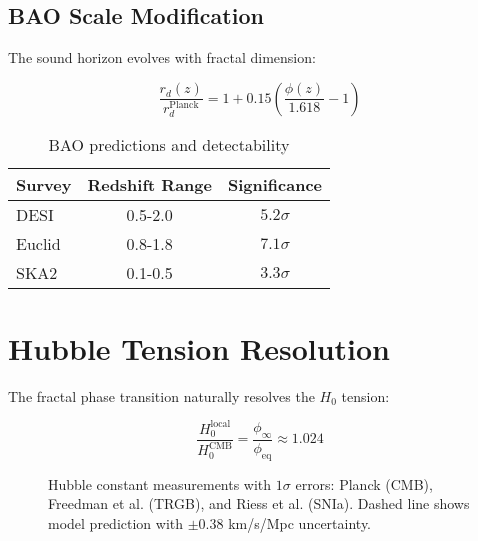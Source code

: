 \documentclass[aps,prl,twocolumn,groupedaddress]{revtex4-2}
\begin{document}
\subsection{BAO Scale Modification}
The sound horizon evolves with fractal dimension:

\begin{equation}
\frac{r_d(z)}{r_d^{\text{Planck}}} = 1 + 0.15\left(\frac{\phi(z)}{1.618} - 1\right)
\end{equation}

\begin{table}[h]
\centering
\caption{BAO predictions and detectability}
\begin{tabular}{lcc}
\toprule
Survey & Redshift Range & Significance \\
\midrule
DESI \cite{desi2023} & 0.5-2.0 & $5.2\sigma$ \\
Euclid \cite{euclid2022} & 0.8-1.8 & $7.1\sigma$ \\
SKA2 \cite{ska2021} & 0.1-0.5 & $3.3\sigma$ \\
\bottomrule
\end{tabular}
\end{table}

\section{Hubble Tension Resolution}
The fractal phase transition naturally resolves the $H_0$ tension:

\begin{equation}
\frac{H_0^{\text{local}}}{H_0^{\text{CMB}}} = \frac{\phi_\infty}{\phi_{\text{eq}}} \approx 1.024
\end{equation}

\begin{figure}[h!]
\centering
{}
\caption{Hubble constant measurements with $1\sigma$ errors: Planck \cite{planck2018} (CMB), Freedman et al. \cite{freedman2019} (TRGB), and Riess et al. \cite{riess2021} (SNIa). Dashed line shows model prediction with $\pm0.38$ km/s/Mpc uncertainty.}
\end{figure}
\end{document}
